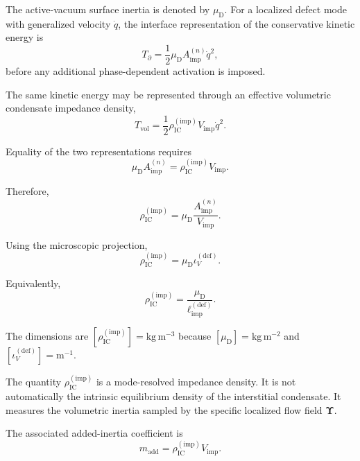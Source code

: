 The active-vacuum surface inertia is denoted by $\mu_{\mathrm{D}}$. For a localized defect mode with generalized velocity $\dot{q}$, the interface representation of the conservative kinetic energy is
\begin{equation}
    T_{\partial} = \frac{1}{2} \mu_{\mathrm{D}} A_{\mathrm{imp}}^{(n)} \dot{q}^2,
\end{equation}
before any additional phase-dependent activation is imposed.

The same kinetic energy may be represented through an effective volumetric condensate impedance density,
\begin{equation}
    T_{\mathrm{vol}} = \frac{1}{2} \rho_{\mathrm{IC}}^{(\mathrm{imp})} V_{\mathrm{imp}} \dot{q}^2.
\end{equation}

Equality of the two representations requires
\begin{equation}
    \mu_{\mathrm{D}} A_{\mathrm{imp}}^{(n)} = \rho_{\mathrm{IC}}^{(\mathrm{imp})} V_{\mathrm{imp}}.
\end{equation}

Therefore,
\begin{equation}
    \rho_{\mathrm{IC}}^{(\mathrm{imp})} = \mu_{\mathrm{D}} \frac{ A_{\mathrm{imp}}^{(n)} }{ V_{\mathrm{imp}} }.
\end{equation}

Using the microscopic projection,
\begin{equation}
    \boxed{ \rho_{\mathrm{IC}}^{(\mathrm{imp})} = \mu_{\mathrm{D}} \iota_V^{(\mathrm{def})} }.
\end{equation}

Equivalently,
\begin{equation}
    \rho_{\mathrm{IC}}^{(\mathrm{imp})} = \frac{ \mu_{\mathrm{D}} }{ \ell_{\mathrm{imp}}^{(\mathrm{def})} }.
\end{equation}

The dimensions are $[\rho_{\mathrm{IC}}^{(\mathrm{imp})}] = \mathrm{kg\,m^{-3}}$ because $[\mu_{\mathrm{D}}] = \mathrm{kg\,m^{-2}}$ and $[\iota_V^{(\mathrm{def})}] = \mathrm{m}^{-1}$.

The quantity $\rho_{\mathrm{IC}}^{(\mathrm{imp})}$ is a mode-resolved impedance density. It is not automatically the intrinsic equilibrium density of the interstitial condensate. It measures the volumetric inertia sampled by the specific localized flow field $\boldsymbol{\Upsilon}$.

The associated added-inertia coefficient is
\begin{equation}
    m_{\mathrm{add}} = \rho_{\mathrm{IC}}^{(\mathrm{imp})} V_{\mathrm{imp}}.
\end{equation}

